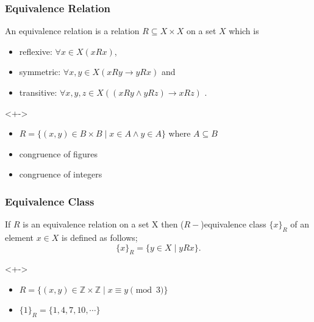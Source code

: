 \documentclass[handout, 12pt, aspectratio=169]{beamer}
\begin{document}
\begin{frame}
    \frametitle{Equivalence Relation}
    \begin{definition}
        An equivalence relation is a relation $R \subseteq X \times X$ on a set $X$ which is
        \begin{itemize}
            \item reflexive: $\forall x \in X(xRx)$,
            \item symmetric: $\forall x,y \in X(xRy \to yRx)$ and
            \item transitive: $\forall x,y,z \in X((xRy \land yRz) \to xRz)$ .
        \end{itemize}
    \end{definition}
    \begin{example}<+->
        \begin{itemize}
            \item $R = \{(x,y) \in B \times B \mid x \in A \land y \in A\} $ where $A \subseteq B$
            \item congruence of figures
            \item congruence of integers
        \end{itemize}
    \end{example}
\end{frame}

\begin{frame}
    \frametitle{Equivalence Class}
    \begin{definition}
        If $R$ is an equivalence relation on a set X then ($R-$)equivalence class $\{x\}_R$ of an element $x\in X$
        is defined as follows;
        \[
            \{x\}_R = \{y \in X \mid yRx\}.
        \]
    \end{definition}
    \begin{example}<+->
        \begin{itemize}
            \item $R = \{(x,y) \in \mathbb{Z} \times \mathbb{Z} \mid x \equiv y\pmod 3\}$
            \item $\{1\}_R = \{1, 4, 7, 10, \cdots\}$
        \end{itemize}
    \end{example}
\end{frame}
\end{document}

